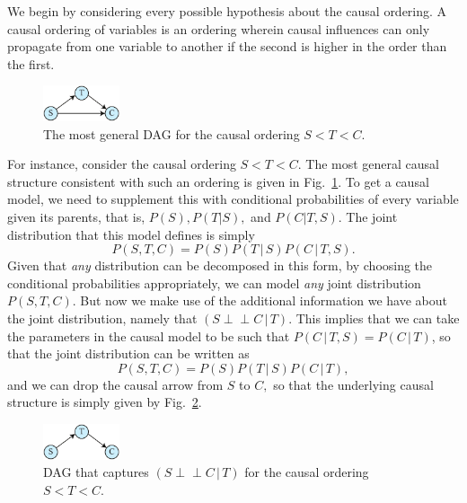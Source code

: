 \documentclass[12pt,onecolumn,nofootinbib]{revtex4-2}
\def\indep{\perp\!\!\!\!\perp}
\begin{document}
We begin by considering every possible hypothesis about the causal ordering. A
causal ordering of variables is an ordering wherein causal influences can
only propagate from one variable to another if the second is higher in the
order than the first.

\begin{figure}[h]
	\centering
	\includegraphics[width=0.2\textwidth]{smoke-gen}
 \caption{The most general DAG for the causal ordering $S<T<C$.}
       \label{fig:smoke-STC-gen}
\end{figure}

For instance, consider the causal ordering $S<T<C.$ The most general
causal structure consistent with such an ordering is given in Fig.~\ref{fig:smoke-STC-gen}.
To get a causal model, we need to supplement this with conditional
probabilities of every variable given its parents, that is, $P(S),P(T|S),$
and $P(C|T,S).$ The joint distribution that this model defines is simply%
\begin{equation*}
P(S,T,C)=P(S)P(T\,|\,S)P(C\,|\,T,S).
\end{equation*}%
Given that \emph{any} distribution can be decomposed in this form, by
choosing the conditional probabilities appropriately, we can model \emph{any
}joint distribution $P(S,T,C).$ But now we make use of the additional
information we have about the joint distribution, namely that $(S\indep C\,|\,T).$
This implies that we can take the parameters in
the causal model to be such that $P(C\,|\,T,S)=P(C\,|\,T)$, so that the joint
distribution can be written as
\begin{equation*}
P(S,T,C)=P(S)P(T\,|\,S)P(C\,|\,T),
\end{equation*}%
and we can drop the causal arrow from $S$ to $C,$ so that the underlying causal structure is simply given by Fig.~\ref{fig:smoke-STC-ind}.
\begin{figure}[h]
	\centering
	\includegraphics[width=0.2\textwidth]{smoke-ind}
 \caption{DAG that captures $(S\indep C\,|\,T)$ for the causal ordering $S<T<C$.}
       \label{fig:smoke-STC-ind}
\end{figure}
\end{document}
